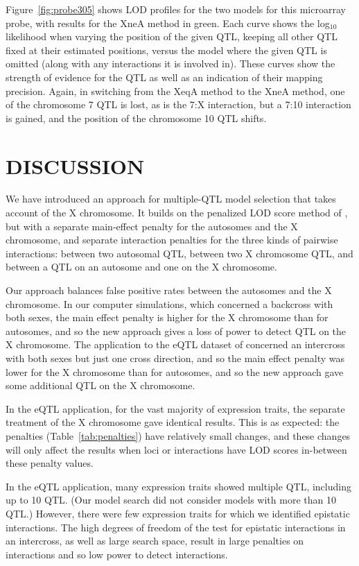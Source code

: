\documentclass[12pt,letterpaper]{article}
\begin{document}
Figure~\ref{fig:probe305} shows LOD profiles for the two models for
this microarray probe, with results for the XneA method in green. Each
curve shows the log$_{10}$ likelihood when varying the position of the
given QTL, keeping all other QTL fixed at their estimated positions,
versus the model where the given QTL is omitted (along with any
interactions it is involved in). These curves show the strength of
evidence for the QTL as well as an indication of their mapping
precision. Again, in switching from the XeqA method to the XneA
method, one of the chromosome 7 QTL is lost, as is the 7:X
interaction, but a 7:10 interaction is gained, and the position of the
chromosome 10 QTL shifts.


\clearpage
\section*{DISCUSSION}

We have introduced an approach for multiple-QTL model selection that
takes account of the X chromosome. It builds on the penalized LOD
score method of \citet{Manichaikul2009}, but with a separate
main-effect penalty for the autosomes and the X chromosome, and
separate interaction penalties for the three kinds of pairwise
interactions: between two autosomal QTL, between two X chromosome QTL,
and between a QTL on an autosome and one on the X chromosome.

Our approach balances false positive rates between the autosomes and
the X chromosome. In our computer simulations, which concerned a
backcross with both sexes, the main effect penalty is higher for the X
chromosome than for autosomes, and so the new approach gives a loss of
power to detect QTL on the X chromosome. The application to the
eQTL dataset of \citet{Tian2016} concerned an intercross with both
sexes but just one cross direction, and so the main effect penalty was
lower for the X chromosome than for autosomes, and so the new approach
gave some additional QTL on the X chromosome.

In the eQTL application, for the vast majority of expression traits,
the separate treatment of the X chromosome gave identical results.
This is as expected: the penalties (Table~\ref{tab:penalties}) have
relatively small changes, and these changes will only affect the
results when loci or interactions have LOD scores in-between these
penalty values.

In the eQTL application, many expression traits showed multiple QTL,
including up to 10 QTL. (Our model search did not consider models with
more than 10 QTL.) However, there were few expression traits for which
we identified epistatic interactions. The high degrees of freedom of
the test for epistatic interactions in an intercross, as well as large
search space, result in large penalties on interactions and so low
power to detect interactions.
\end{document}
